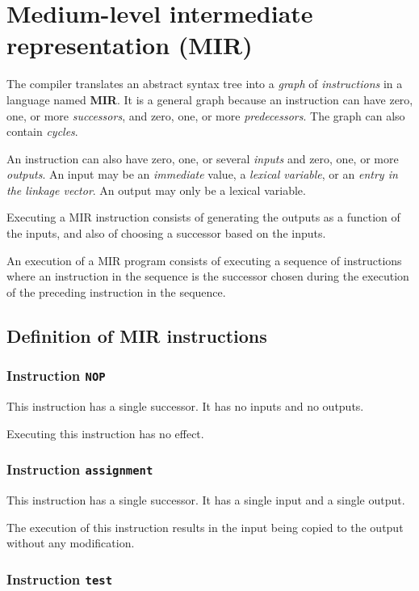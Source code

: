 \chapter{Medium-level intermediate representation (MIR)}

The compiler translates an abstract syntax tree into a \emph{graph} of
\emph{instructions} in a language named \textbf{MIR}.  It is a general
graph because an instruction can have zero, one, or more
\emph{successors}, and zero, one, or more \emph{predecessors}.  The
graph can also contain \emph{cycles}.  

An instruction can also have zero, one, or several \emph{inputs} and
zero, one, or more \emph{outputs}.  An input may be an
\emph{immediate} value, a \emph{lexical variable}, or an \emph{entry
  in the linkage vector}.  An output may only be a lexical variable.

Executing a MIR instruction consists of generating the outputs as a
function of the inputs, and also of choosing a successor based on the
inputs.

An execution of a MIR program consists of executing a sequence of
instructions where an instruction in the sequence is the successor
chosen during the execution of the preceding instruction in the
sequence.

\section{Definition of MIR instructions}

\subsection{Instruction \texttt{NOP}}

This instruction has a single successor.  It has no inputs and no
outputs.

Executing this instruction has no effect. 

\subsection{Instruction \texttt{assignment}}

This instruction has a single successor.  It has a single input and a
single output. 

The execution of this instruction results in the input being copied to
the output without any modification. 

\subsection{Instruction \texttt{test}}

